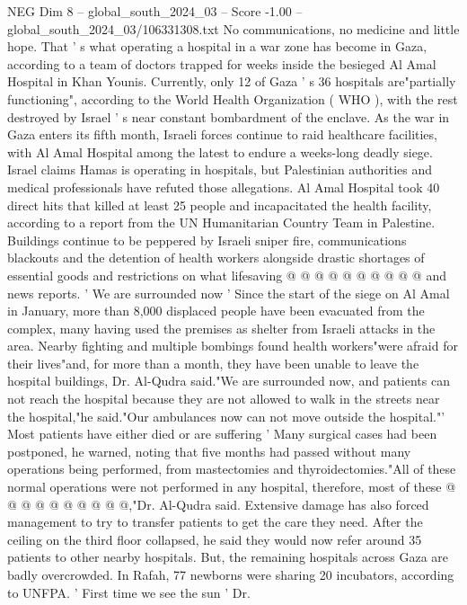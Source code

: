 \begin{textsample}{NEG Dim 8 – global\_south\_2024\_03 – Score -1.00 – global\_south\_2024\_03/106331308.txt}  \label{ex:f8_neg_360}
No communications, no medicine and little hope.
That ' s what operating a hospital in a war zone has become in Gaza, according to a team of doctors trapped for weeks inside the besieged Al Amal Hospital in Khan Younis.
Currently, only 12 of Gaza ' s 36 hospitals are"partially functioning", according to the World Health Organization ( WHO ), with the rest destroyed by Israel ' s near constant bombardment of the enclave.
As the war in Gaza enters its fifth month, Israeli forces continue to raid healthcare facilities, with Al Amal Hospital among the latest to endure a weeks-long deadly siege.
Israel claims Hamas is operating in hospitals, but Palestinian authorities and medical professionals have refuted those allegations.
Al Amal Hospital took 40 direct hits that killed at least 25 people and incapacitated the health facility, according to a report from the UN Humanitarian Country Team in Palestine.
Buildings continue to be peppered by Israeli sniper fire, communications blackouts and the detention of health workers alongside drastic shortages of essential goods and restrictions on what lifesaving @ @ @ @ @ @ @ @ @ @ and news reports. ' We are surrounded now ' Since the start of the siege on Al Amal in January, more than 8,000 displaced people have been evacuated from the complex, many having used the premises as shelter from Israeli attacks in the area.
Nearby fighting and multiple bombings found health workers"were afraid for their lives"and, for more than a month, they have been unable to leave the hospital buildings, Dr.
Al-Qudra said."We are surrounded now, and patients can not reach the hospital because they are not allowed to walk in the streets near the hospital,"he said."Our ambulances now can not move outside the hospital."' Most patients have either died or are suffering ' Many surgical cases had been postponed, he warned, noting that five months had passed without many operations being performed, from mastectomies and thyroidectomies."All of these normal operations were not performed in any hospital, therefore, most of these @ @ @ @ @ @ @ @ @ @,"Dr.
Al-Qudra said.
Extensive damage has also forced management to try to transfer patients to get the care they need.
After the ceiling on the third floor collapsed, he said they would now refer around 35 patients to other nearby hospitals.
But, the remaining hospitals across Gaza are badly overcrowded.
In Rafah, 77 newborns were sharing 20 incubators, according to UNFPA. ' First time we see the sun ' Dr.

\end{textsample}
